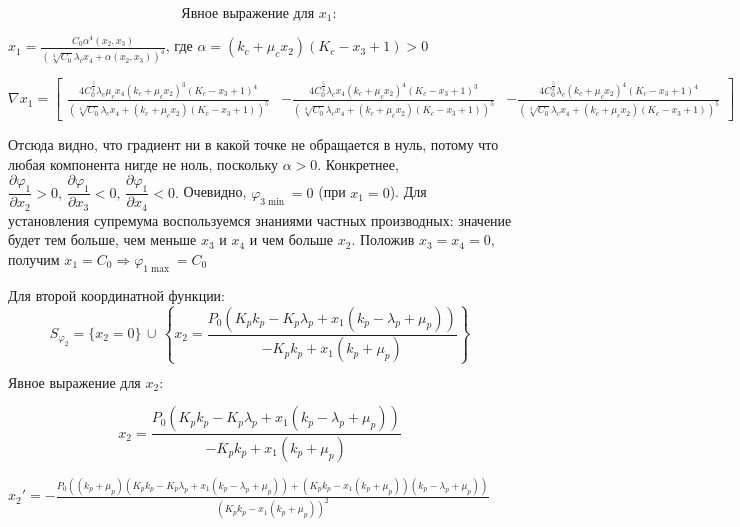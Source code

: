 \documentclass[11pt]{article}
\begin{document}
    $$ \text{Явное выражение для } x_1: $$

    
    $ x_1 = \frac{C_{0} \alpha^{4}{\left(x_{2},x_{3} \right)}}{\left(\sqrt[4]{C_{0}} \lambda_{c} x_{4} + \alpha{\left(x_{2},x_{3} \right)}\right)^{4}}$, где $\alpha = \left(k_{c} + \mu_{c} x_{2}\right) \left(K_{c} - x_{3} + 1\right) > 0$

    
    $\nabla x_1 = \left[\begin{matrix}\frac{4 C_{0}^{\frac{5}{4}} \lambda_{c} \mu_{c} x_{4} \left(k_{c} + \mu_{c} x_{2}\right)^{3} \left(K_{c} - x_{3} + 1\right)^{4}}{\left(\sqrt[4]{C_{0}} \lambda_{c} x_{4} + \left(k_{c} + \mu_{c} x_{2}\right) \left(K_{c} - x_{3} + 1\right)\right)^{5}} & - \frac{4 C_{0}^{\frac{5}{4}} \lambda_{c} x_{4} \left(k_{c} + \mu_{c} x_{2}\right)^{4} \left(K_{c} - x_{3} + 1\right)^{3}}{\left(\sqrt[4]{C_{0}} \lambda_{c} x_{4} + \left(k_{c} + \mu_{c} x_{2}\right) \left(K_{c} - x_{3} + 1\right)\right)^{5}} & - \frac{4 C_{0}^{\frac{5}{4}} \lambda_{c} \left(k_{c} + \mu_{c} x_{2}\right)^{4} \left(K_{c} - x_{3} + 1\right)^{4}}{\left(\sqrt[4]{C_{0}} \lambda_{c} x_{4} + \left(k_{c} + \mu_{c} x_{2}\right) \left(K_{c} - x_{3} + 1\right)\right)^{5}}\end{matrix}\right] $

    
    Отсюда видно, что градиент ни в какой точке не обращается в нуль, потому
что любая компонента нигде не ноль, поскольку \(\alpha > 0.\)
Конкретнее,
\(\dfrac{\partial \varphi_1}{\partial x_2} > 0,\,  \dfrac{\partial \varphi_1}{\partial x_3} < 0,\,  \dfrac{\partial \varphi_1}{\partial x_4} < 0.\)
Очевидно, \(\varphi_{3 \min} = 0\) (при \(x_1 = 0\)). Для установления
супремума воспользуемся знаниями частных производных: значение будет тем
больше, чем меньше \(x_3\) и \(x_4\) и чем больше \(x_2\). Положив
\(x_3 = x_4 = 0\), получим
\(x_1 = C_0 \Rightarrow \varphi_{1 \max} = C_0\)

    Для второй координатной функции:
\[ S_{\varphi_2} = \{ x_2 = 0\}\, \cup \, 
\left\{ x_2 = 
\dfrac{P_{0} \left(K_{p} k_{p} - K_{p} \lambda_{p} + x_{1} \left(k_{p} - \lambda_{p} + \mu_{p}\right)\right)}{- K_{p} k_{p} + x_{1} \left(k_{p} + \mu_{p}\right)}
\right\} \]

    $ \text{Явное выражение для } x_2: $

    
    $$ x_2 = \frac{P_{0} \left(K_{p} k_{p} - K_{p} \lambda_{p} + x_{1} \left(k_{p} - \lambda_{p} + \mu_{p}\right)\right)}{- K_{p} k_{p} + x_{1} \left(k_{p} + \mu_{p}\right)}$$

    
    $ x_2' = - \frac{P_{0} \left(\left(k_{p} + \mu_{p}\right) \left(K_{p} k_{p} - K_{p} \lambda_{p} + x_{1} \left(k_{p} - \lambda_{p} + \mu_{p}\right)\right) + \left(K_{p} k_{p} - x_{1} \left(k_{p} + \mu_{p}\right)\right) \left(k_{p} - \lambda_{p} + \mu_{p}\right)\right)}{\left(K_{p} k_{p} - x_{1} \left(k_{p} + \mu_{p}\right)\right)^{2}} $
\end{document}
